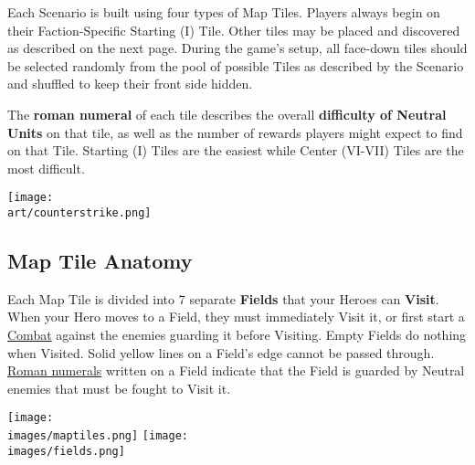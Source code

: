 
\begin{multicols*}{2}
Each Scenario is built using four types of Map Tiles.
Players always begin on their Faction-Specific Starting (I) Tile.
Other tiles may be placed and discovered as described on the next page.
During the game's setup, all face-down tiles should be selected randomly from the pool of possible Tiles as described by the Scenario and shuffled to keep their front side hidden.\par
The \textbf{roman numeral} of each tile describes the overall \textbf{difficulty of Neutral Units} on that tile, as well as the number of rewards players might expect to find on that Tile.
Starting (I) Tiles are the easiest while Center (VI-VII) Tiles are the most difficult.\par

\vfill
\begin{center}
  \texttt{[image: \\art/counterstrike.png]}
\end{center}
\vfill

\subsection*{Map Tile Anatomy}
Each Map Tile is divided into 7 separate \textbf{Fields} that your Heroes can \textbf{Visit}.
When your Hero moves to a Field, they must immediately Visit it, or
first start a \hyperlink{Combat}{Combat} against the enemies guarding it before Visiting.
Empty Fields do nothing when Visited.
Solid yellow lines on a Field's edge cannot be passed through.
\hyperlink{Difficulty}{Roman numerals} written on a Field indicate that the Field is guarded by Neutral enemies that must be fought to Visit it.\par
\columnbreak
\texttt{[image: \\images/maptiles.png]}
\vfill
\texttt{[image: \\images/fields.png]}
\end{multicols*}

\clearpage

